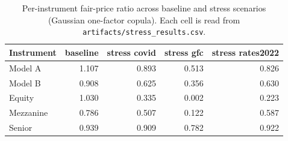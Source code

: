 
\begin{table}[ht]
\centering
\caption{Per-instrument fair-price ratio across baseline and stress scenarios (Gaussian one-factor copula). Each cell is read from \texttt{artifacts/stress\_results.csv}.}
\label{tab:stress}
\small
\begin{tabular}{l r r r r}
\toprule
Instrument & baseline & stress covid & stress gfc & stress rates2022 \\
\midrule
Model A & 1.107 & 0.893 & 0.513 & 0.826 \\
Model B & 0.908 & 0.625 & 0.356 & 0.630 \\
Equity & 1.030 & 0.335 & 0.002 & 0.223 \\
Mezzanine & 0.786 & 0.507 & 0.122 & 0.587 \\
Senior & 0.939 & 0.909 & 0.782 & 0.922 \\
\bottomrule
\end{tabular}
\end{table}
